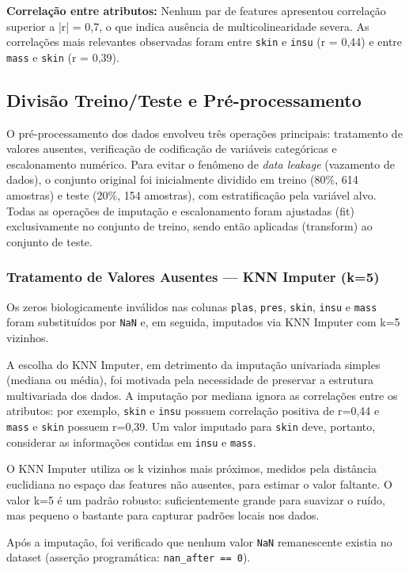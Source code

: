 \documentclass[12pt]{article}
\begin{document}
\textbf{Correlação entre atributos:} Nenhum par de features apresentou correlação superior a |r| = 0,7, o que indica ausência de multicolinearidade severa. As correlações mais relevantes observadas foram entre \texttt{skin} e \texttt{insu} (r = 0,44) e entre \texttt{mass} e \texttt{skin} (r = 0,39).

\subsection{Divisão Treino/Teste e Pré-processamento}

O pré-processamento dos dados envolveu três operações principais: tratamento de valores ausentes, verificação de codificação de variáveis categóricas e escalonamento numérico. Para evitar o fenômeno de \textit{data leakage} (vazamento de dados), o conjunto original foi inicialmente dividido em treino (80\%, 614 amostras) e teste (20\%, 154 amostras), com estratificação pela variável alvo. Todas as operações de imputação e escalonamento foram ajustadas (fit) exclusivamente no conjunto de treino, sendo então aplicadas (transform) ao conjunto de teste.

\subsubsection{Tratamento de Valores Ausentes --- KNN Imputer (k=5)}

Os zeros biologicamente inválidos nas colunas \texttt{plas}, \texttt{pres}, \texttt{skin}, \texttt{insu} e \texttt{mass} foram substituídos por \texttt{NaN} e, em seguida, imputados via KNN Imputer com k=5 vizinhos.

A escolha do KNN Imputer, em detrimento da imputação univariada simples (mediana ou média), foi motivada pela necessidade de preservar a estrutura multivariada dos dados. A imputação por mediana ignora as correlações entre os atributos: por exemplo, \texttt{skin} e \texttt{insu} possuem correlação positiva de r=0,44 e \texttt{mass} e \texttt{skin} possuem r=0,39. Um valor imputado para \texttt{skin} deve, portanto, considerar as informações contidas em \texttt{insu} e \texttt{mass}.

O KNN Imputer utiliza os k vizinhos mais próximos, medidos pela distância euclidiana no espaço das features não ausentes, para estimar o valor faltante. O valor k=5 é um padrão robusto: suficientemente grande para suavizar o ruído, mas pequeno o bastante para capturar padrões locais nos dados.

Após a imputação, foi verificado que nenhum valor \texttt{NaN} remanescente existia no dataset (asserção programática: \texttt{nan\_after == 0}).
\end{document}
